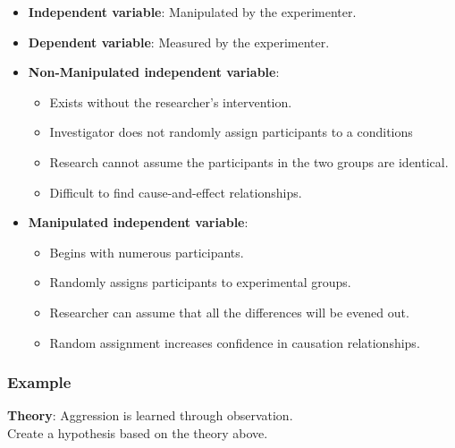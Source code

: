 \begin{itemize}
    \item \textbf{Independent variable}: Manipulated by the experimenter.
    \item \textbf{Dependent variable}: Measured by the experimenter.
    \item \textbf{Non-Manipulated independent variable}: 
    \begin{itemize}
        \item Exists without the researcher's intervention.
        \item Investigator does not randomly assign participants to a conditions
        \item Research cannot assume the participants in the two groups are identical.
        \item Difficult to find cause-and-effect relationships.
    \end{itemize}
    \item \textbf{Manipulated independent variable}:
    \begin{itemize}
        \item Begins with numerous participants.
        \item Randomly assigns participants to experimental groups.
        \item Researcher can assume that all the differences will be evened out.
        \item Random assignment increases confidence in causation relationships.
    \end{itemize}
\end{itemize}

\subsubsection{Example}

\textbf{Theory}: Aggression is learned through observation. \\

\noindent Create a hypothesis based on the theory above. \\